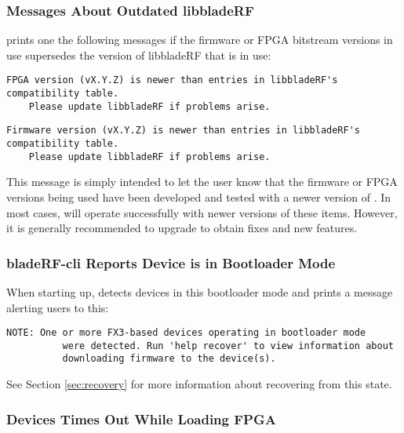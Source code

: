 \subsubsection{Messages About Outdated libbladeRF}

\libbladerf prints one the following messages if the  firmware or FPGA bitstream
versions in use supersedes the version of libbladeRF that is in use:

\begin{lstlisting}[style=snippet]
    FPGA version (vX.Y.Z) is newer than entries in libbladeRF's compatibility table.
    Please update libbladeRF if problems arise.
\end{lstlisting}

\begin{lstlisting}[style=snippet]
    Firmware version (vX.Y.Z) is newer than entries in libbladeRF's compatibility table.
    Please update libbladeRF if problems arise.
\end{lstlisting}

This message is simply intended to let the user know that the firmware or FPGA
versions being used have been developed and tested with a newer version of \libbladerf.
In most cases, \libbladerf will operate successfully with newer versions of
these items. However, it is generally recommended to upgrade \libbladerf to
obtain fixes and new features.

\subsubsection{bladeRF-cli Reports Device is in Bootloader Mode}

When starting up, \bladerfcli detects devices in this bootloader mode
and prints a message alerting users to this: \\

\begin{lstlisting}[style=snippet]
    NOTE: One or more FX3-based devices operating in bootloader mode
          were detected. Run 'help recover' to view information about
          downloading firmware to the device(s).
\end{lstlisting}

See Section \ref{sec:recovery} for more information about recovering from
this state.

\subsubsection{Devices Times Out While Loading FPGA}

